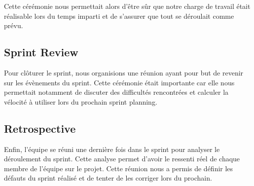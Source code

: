 \documentclass[11pt]{report}
\begin{document}
Cette cérémonie nous permettait alors d'être sûr que notre charge de travail était réalisable lors du temps imparti
et de s'assurer que tout se déroulait comme prévu.

\subsection{Sprint Review}

Pour clôturer le sprint, nous organisions une réunion ayant pour but de revenir sur les évènements du sprint.
Cette cérémonie était importante car elle nous permettait notamment de discuter des difficultés rencontrées et calculer la vélocité 
à utiliser lors du prochain sprint planning.

\subsection{Retrospective}

Enfin, l'équipe se réuni une dernière fois dans le sprint pour analyser le déroulement du sprint. Cette analyse permet d'avoir
le ressenti réel de chaque membre de l'équipe sur le projet. Cette réunion nous a permis de définir les défauts du sprint réalisé
et de tenter de les corriger lors du prochain.
\end{document}
